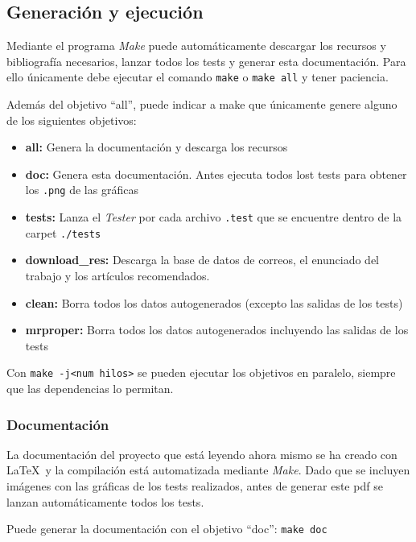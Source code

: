 \subsection{Generación y ejecución}

Mediante el programa \textit{Make} puede automáticamente descargar los recursos
y bibliografía necesarios, lanzar todos los tests y generar esta documentación.
Para ello únicamente debe ejecutar el comando \texttt{make} o \texttt{make all}
y tener paciencia.

Además del objetivo ``all'', puede indicar a make que únicamente genere alguno
de los siguientes objetivos:

\begin{itemize}
	\item \textbf{all:} Genera la documentación y descarga los recursos
	\item \textbf{doc:} Genera esta documentación. Antes ejecuta todos lost
		tests para obtener los \texttt{.png} de las gráficas
	\item \textbf{tests:} Lanza el \textit{Tester} por cada archivo
		\texttt{.test} que se encuentre dentro de la carpet
		\texttt{./tests}
	\item \textbf{download\_res:} Descarga la base de datos de correos, el
		enunciado del trabajo y los artículos recomendados.
	\item \textbf{clean:} Borra todos los datos autogenerados (excepto las
		salidas de los tests)
	\item \textbf{mrproper:} Borra todos los datos autogenerados incluyendo
		las salidas de los tests
\end{itemize}

Con \texttt{make -j<num hilos>} se pueden ejecutar los objetivos en paralelo,
siempre que las dependencias lo permitan.

\subsubsection{Documentación}

La documentación del proyecto que está leyendo ahora mismo se ha creado con
\LaTeX~y la compilación está automatizada mediante \textit{Make}. Dado que se
incluyen imágenes con las gráficas de los tests realizados, antes de generar
este pdf se lanzan automáticamente todos los tests.

Puede generar la documentación con el objetivo ``doc'': \texttt{make doc}

\def\helpvfn{\value{footnote}}
\def\helpfn{\footnotemark[\helpvfn]}
